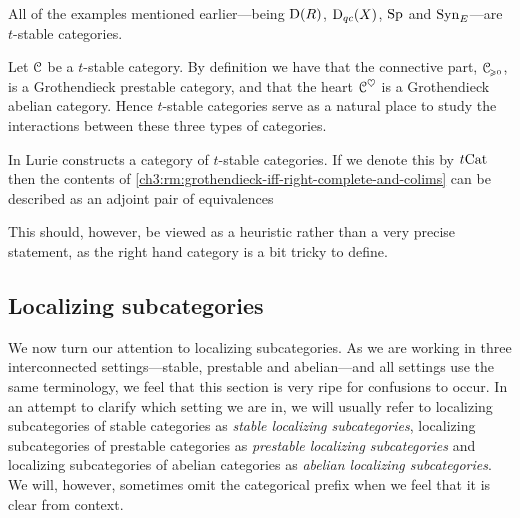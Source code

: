 \begin{example}
    All of the examples mentioned earlier---being $\mathrm{D}(R)$, $\mathrm{D}_{qc}(X)$, $\mathrm{Sp}$ and $\mathrm{Syn}_{E}$---are $t$-stable categories. 
\end{example}

\begin{remark}
    Let $\EuScript{C}$ be a $t$-stable category. By definition we have that the connective part, $\EuScript{C}_{\hspace{-1pt}\scriptscriptstyle\geqslant 0}$, is a Grothendieck prestable category, and that the heart $\EuScript{C}^\heartsuit$ is a Grothendieck abelian category. Hence $t$-stable categories serve as a natural place to study the interactions between these three types of categories. 
\end{remark}

\begin{remark}
    In \cite[Section C.3.1]{lurie_SAG} Lurie constructs a category of $t$-stable categories. If we denote this by $t\mathrm{Cat}$ then the contents of \cref{ch3:rm:grothendieck-iff-right-complete-and-colims} can be described as an adjoint pair of equivalences
    \begin{center}
    \end{center}
    This should, however, be viewed as a heuristic rather than a very precise statement, as the right hand category is a bit tricky to define. 
\end{remark}







\subsection{Localizing subcategories}
\label{ch3:ssec:localizing-subcategories}

We now turn our attention to localizing subcategories. As we are working in three interconnected settings---stable, prestable and abelian---and all settings use the same terminology, we feel that this section is very ripe for confusions to occur. In an attempt to clarify which setting we are in, we will usually refer to localizing subcategories of stable categories as \emph{stable localizing subcategories}, localizing subcategories of prestable categories as \emph{prestable localizing subcategories} and localizing subcategories of abelian categories as \emph{abelian localizing subcategories}. We will, however, sometimes omit the categorical prefix when we feel that it is clear from context. 

